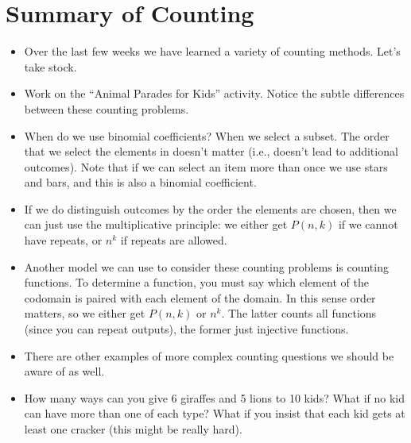 \documentclass[12pt]{article}
\theoremstyle{plain}
\theoremstyle{definition}
\theoremstyle{remark}
\newcommand{\todayis}[1]{\clearpage{\rhead{\footnotesize #1}}}
\begin{document}
\todayis{Friday, October 19}
\section*{Summary of Counting}

\begin{itemize}

	\item Over the last few weeks we have learned a variety of counting methods.  Let's take stock.

	\item Work on the ``Animal Parades for Kids'' activity.  Notice the subtle differences between these counting problems.

	\item When do we use binomial coefficients?  When we select a subset.  The order that we select the elements in doesn't matter (i.e., doesn't lead to additional outcomes).  Note that if we can select an item more than once we use stars and bars, and this is also a binomial coefficient.

	\item If we do distinguish outcomes by the order the elements are chosen, then we can just use the multiplicative principle: we either get $P(n,k)$ if we cannot have repeats, or $n^k$ if repeats are allowed.

	\item Another model we can use to consider these counting problems is counting functions.  To determine a function, you must say which element of the codomain is paired with each element of the domain.  In this sense order matters, so we either get $P(n,k)$ or $n^k$.  The latter counts all functions (since you can repeat outputs), the former just injective functions.


	\item There are other examples of more complex counting questions we should be aware of as well.

	\item How many ways can you give 6 giraffes and 5 lions to  10 kids?  What if no kid can have more than one of each type?  What if you insist that each kid gets at least one cracker (this might be really hard).


\end{itemize}
\end{document}
